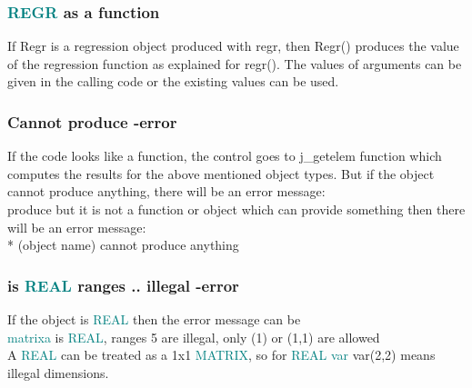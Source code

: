 {\subsubsection{\textcolor{teal}{REGR} as a function} 
\label{regrfunc} 
If Regr is a regression object produced with regr, then Regr() produces 
the value of the regression function as explained for \textcolor{VioletRed}{regr}(). The values of arguments 
can be given in the calling code or the existing values can be used. 
\subsubsection{Cannot produce -error} 
\label{isnotfunc} 
If the code looks like a function, the control goes to j\_getelem function 
which computes the results for the above mentioned object types. But if 
the object cannot produce anything, there will be an error message:\\ 
produce   but it is not a function or object which can provide something then 
there will be an error message:\\ 
* (object name) cannot produce anything 
\subsubsection{is \textcolor{teal}{REAL} ranges .. illegal  -error} 
\label{isreal} 
If the object is \textcolor{teal}{REAL} then the error message can be \\ 
\textcolor{teal}{matrixa} is \textcolor{teal}{REAL}, ranges            5  are illegal, only (1) or (1,1) are allowed\\ 
A \textcolor{teal}{REAL} can be treated as a 1x1 \textcolor{teal}{MATRIX}, so for \textcolor{teal}{REAL} \textcolor{teal}{var} \textcolor{VioletRed}{var}(2,2) means illegal dimensions. 
}

